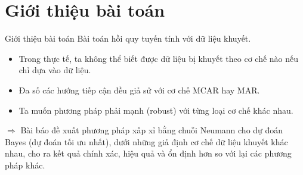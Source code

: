 \documentclass[aspectratio=169, 10pt]{beamer} %
\begin{document}
\section{Giới thiệu bài toán}
\begin{frame}{Giới thiệu bài toán}
    Bài toán hồi quy tuyến tính với dữ liệu khuyết.

    \begin{itemize}
        \item Trong thực tế, ta không thể biết được dữ liệu bị khuyết theo cơ chế nào nếu chỉ dựa vào dữ liệu.
        \item Đa số các hướng tiếp cận đều giả sử với cơ chế MCAR hay MAR.
        \item Ta muốn phương pháp phải mạnh (robust) với từng loại cơ chế khác nhau.
    \end{itemize}
    \pause
    $\Rightarrow$ Bài báo \cite{le2020neumiss} đề xuất phương pháp xấp xỉ bằng chuỗi Neumann cho dự đoán Bayes (dự đoán tối ưu nhất), dưới những giả định cơ chế dữ liệu khuyết khác nhau, cho ra kết quả chính xác, hiệu quả và ổn định hơn so với lại các phương pháp khác.

\end{frame}
\end{document}
